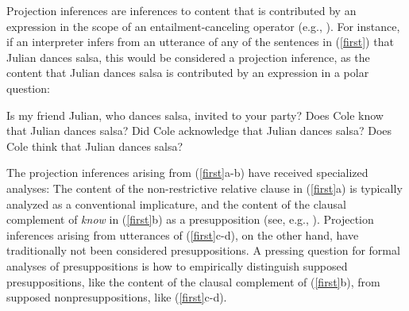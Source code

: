 \documentclass[11pt,fleqn]{article}
\newcommand{\6}{\mbox{$[\hspace*{-.6mm}[$}}
\newcommand{\9}{\mbox{$]\hspace*{-.6mm}]$}}
\begin{document}
Projection inferences are inferences to content that is contributed by an expression in the scope of an entailment-canceling operator (e.g., \citealt{potts05,brst-lang11,tbd-variability,degen-tonhauser-language}). For instance, if an interpreter infers from an utterance of any of the sentences in (\ref{first}) that Julian dances salsa, this would be considered a projection inference, as the content that Julian dances salsa is contributed by an expression in a polar question:
\begin{exe}
\ex\label{first} 
\begin{xlist}
\ex Is my friend Julian, who dances salsa, invited to your party?
\ex Does Cole know that Julian dances salsa?
\ex Did Cole acknowledge that Julian dances salsa?
\ex Does Cole think that Julian dances salsa?
\end{xlist}
\end{exe}
The projection inferences arising from (\ref{first}a-b) have received specialized analyses: The content of the non-restrictive relative clause in (\ref{first}a) is typically analyzed as a conventional implicature, and the content of the clausal complement of \emph{know} in (\ref{first}b) as a presupposition (see, e.g., \citealt{ccmg90,potts05,brst-lang11}).  Projection inferences arising from utterances of (\ref{first}c-d), on the other hand, have traditionally not been considered presuppositions. A pressing question for formal analyses of presuppositions is how to empirically distinguish supposed presuppositions, like the content of the clausal complement of (\ref{first}b), from supposed nonpresuppositions, like (\ref{first}c-d). 
\end{document}
